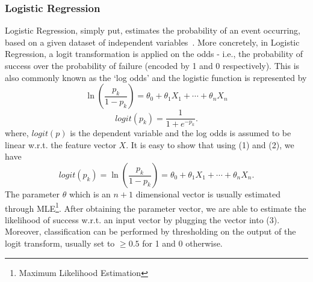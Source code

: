 \documentclass[journal,onecolumn]{IEEEtran}
\begin{document}
\subsubsection{Logistic Regression}
Logistic Regression, simply put, estimates the probability of an event occurring,
based on a given dataset of independent variables~\cite{logreg}. More concretely,
in Logistic Regression, a logit transformation is applied on the odds - i.e.,
the probability of success over the probability of failure (encoded by 1 and 0 respectively).
This is also commonly known as the `log odds' and the logistic function is represented by
\begin{equation}
  \ln(\frac{p_k}{1-p_k}) = \theta_0 + \theta_1X_1 + \cdots + \theta_nX_n
\end{equation}
\begin{equation}
  logit(p_k) = \frac{1}{1 + e^{-p_k}}.
\end{equation}
where, $logit(p)$ is the dependent variable and the log odds is assumed
to be linear w.r.t. the feature vector $X$.
It is easy to show that using (1) and (2), we have
\begin{equation}
  logit(p_k) = \ln(\frac{p_k}{1-p_k}) = \theta_0 + \theta_1X_1 + \cdots + \theta_nX_n.
\end{equation}
The parameter $\theta$ which is an $n+1$
dimensional vector is usually estimated through MLE\footnote{Maximum Likelihood Estimation}.
After obtaining the parameter vector, we are able to estimate the likelihood of success w.r.t. 
an input vector by plugging the vector into (3). Moreover, classification can be performed
by thresholding on the output of the logit transform, usually set to $\ge0.5$ for 1 and 0 otherwise.
\end{document}
